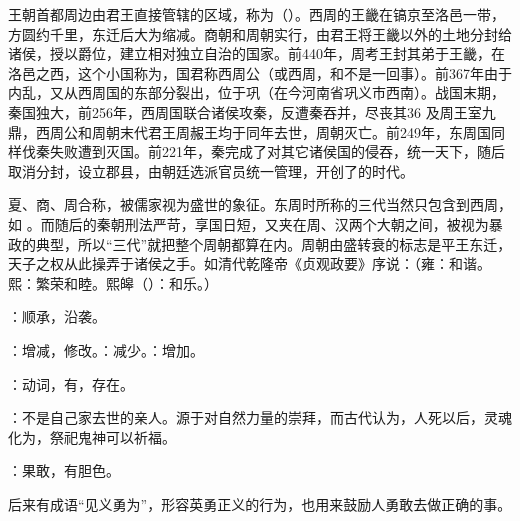 {
王朝首都周边由君王直接管辖的区域，称为（）。西周的王畿在镐京至洛邑一带，方圆约千里，东迁后大为缩减。商朝和周朝实行，由君王将王畿以外的土地分封给诸侯，授以爵位，建立相对独立自治的国家。前440年，周考王封其弟于王畿，在洛邑之西，这个小国称为，国君称西周公（或西周，和不是一回事）。前367年由于内乱，又从西周国的东部分裂出，位于巩（在今河南省巩义市西南）。战国末期，秦国独大，前256年，西周国联合诸侯攻秦，反遭秦吞并，尽丧其36 及周王室九鼎，西周公和周朝末代君王周赧王均于同年去世，周朝灭亡。前249年，东周国同样伐秦失败遭到灭国。前221年，秦完成了对其它诸侯国的侵吞，统一天下，随后取消分封，设立郡县，由朝廷选派官员统一管理，开创了的时代。

夏、商、周合称，被儒家视为盛世的象征。东周时所称的三代当然只包含到西周，如  。而随后的秦朝刑法严苛，享国日短，又夹在周、汉两个大朝之间，被视为暴政的典型，所以“三代”就把整个周朝都算在内。周朝由盛转衰的标志是平王东迁，天子之权从此操弄于诸侯之手。如清代乾隆帝《贞观政要》序说：（雍：和谐。熙：繁荣和睦。熙皞（）：和乐。）

\item {}：顺承，沿袭。

\item {}：增减，修改。：减少。：增加。

\item {}：动词，有，存在。
}
{}  %


{
\item {}：不是自己家去世的亲人。源于对自然力量的崇拜，而古代认为，人死以后，灵魂化为，祭祀鬼神可以祈福。

\item {}：果敢，有胆色。

后来有成语“见义勇为”，形容英勇正义的行为，也用来鼓励人勇敢去做正确的事。
}
{}



